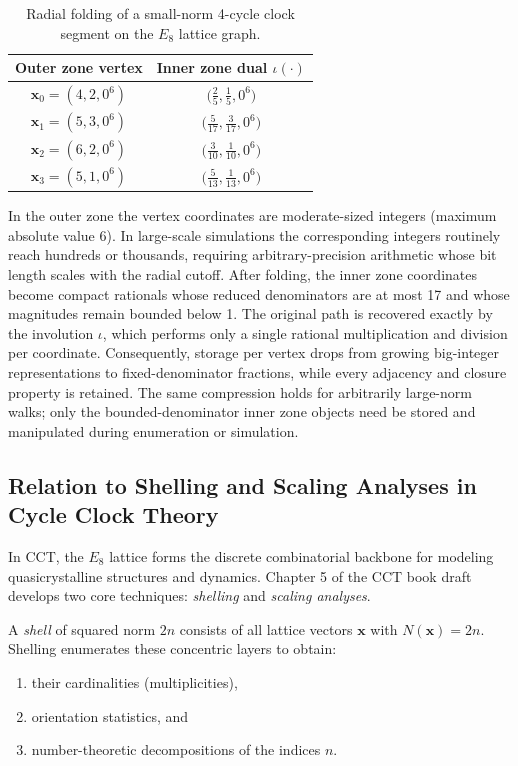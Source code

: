 \documentclass{article}
\begin{document}
\begin{table}[htbp]
\centering
\caption{Radial folding of a small-norm 4-cycle clock segment on the $E_8$ lattice graph.}
\label{tab:radial-fold-example}
\begin{tabular}{c|c}
\textbf{Outer zone vertex} & \textbf{Inner zone dual $\iota(\cdot)$} \\
\hline
$\mathbf{x}_0 = (4,2,0^6)$ & $\bigl( \frac{2}{5},\frac{1}{5},0^6 \bigr)$ \\
$\mathbf{x}_1 = (5,3,0^6)$ & $\bigl( \frac{5}{17},\frac{3}{17},0^6 \bigr)$ \\
$\mathbf{x}_2 = (6,2,0^6)$ & $\bigl( \frac{3}{10},\frac{1}{10},0^6 \bigr)$ \\
$\mathbf{x}_3 = (5,1,0^6)$ & $\bigl( \frac{5}{13},\frac{1}{13},0^6 \bigr)$
\end{tabular}
\end{table}

In the outer zone the vertex coordinates are moderate-sized integers (maximum absolute value 6). In large-scale simulations the corresponding integers routinely reach hundreds or thousands, requiring arbitrary-precision arithmetic whose bit length scales with the radial cutoff. After folding, the inner zone coordinates become compact rationals whose reduced denominators are at most 17 and whose magnitudes remain bounded below 1. The original path is recovered exactly by the involution $\iota$, which performs only a single rational multiplication and division per coordinate. Consequently, storage per vertex drops from growing big-integer representations to fixed-denominator fractions, while every adjacency and closure property is retained. The same compression holds for arbitrarily large-norm walks; only the bounded-denominator inner zone objects need be stored and manipulated during enumeration or simulation.

\subsection{Relation to Shelling and Scaling Analyses in Cycle Clock Theory}
\label{subsec:cct-shelling-relation}

In CCT, the $E_8$ lattice forms the discrete combinatorial backbone for modeling quasicrystalline structures and dynamics. Chapter 5 of the CCT book draft \cite{QGR_CCT} develops two core techniques: \emph{shelling} and \emph{scaling analyses}.

A \emph{shell} of squared norm $2n$ consists of all lattice vectors $\mathbf{x}$ with $N(\mathbf{x})=2n$. Shelling enumerates these concentric layers to obtain:
\begin{enumerate}
 \item their cardinalities (multiplicities),
 \item orientation statistics, and
 \item number-theoretic decompositions of the indices $n$.
\end{enumerate}
\end{document}
